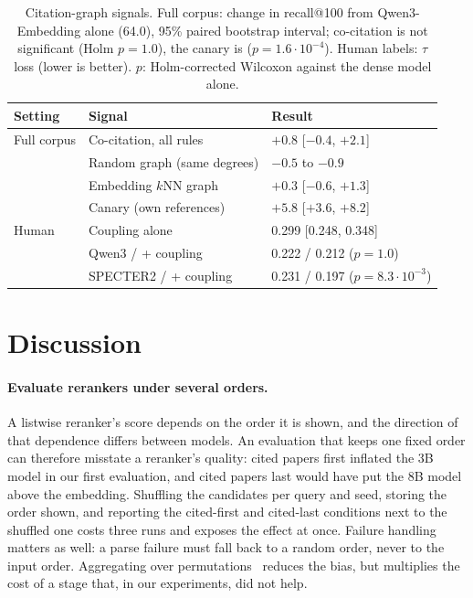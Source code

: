 \documentclass[sigconf,nonacm]{acmart}
\begin{document}
\begin{table}[t]
  \caption{Citation-graph signals. Full corpus: change in recall@100 from Qwen3-Embedding alone (64.0), 95\% paired bootstrap interval; co-citation is not significant (Holm $p = 1.0$), the canary is ($p = 1.6 \cdot 10^{-4}$). Human labels: $\tau$ loss (lower is better). $p$: Holm-corrected Wilcoxon against the dense model alone.}
  \label{tab:graph}
  \small
  \setlength{\tabcolsep}{4pt}
  \begin{tabular}{@{}lll@{}}
    \toprule
    Setting & Signal & Result \\
    \midrule
    Full corpus & Co-citation, all rules & $+0.8$ [$-0.4$, $+2.1$] \\
     & Random graph (same degrees) & $-0.5$ to $-0.9$ \\
     & Embedding $k$NN graph & $+0.3$ [$-0.6$, $+1.3$] \\
     & Canary (own references) & $+5.8$ [$+3.6$, $+8.2$] \\
    \midrule
    Human & Coupling alone & 0.299 [0.248, 0.348] \\
     & Qwen3 / + coupling & 0.222 / 0.212 ($p = 1.0$) \\
     & SPECTER2 / + coupling & 0.231 / 0.197 ($p = 8.3 \cdot 10^{-3}$) \\
    \bottomrule
  \end{tabular}
\end{table}

\section{Discussion}
\label{sec:discussion}
\paragraph{Evaluate rerankers under several orders.}
A listwise reranker's score depends on the order it is shown, and the direction of that dependence differs between models.
An evaluation that keeps one fixed order can therefore misstate a reranker's quality: cited papers first inflated the 3B model in our first evaluation, and cited papers last would have put the 8B model above the embedding.
Shuffling the candidates per query and seed, storing the order shown, and reporting the cited-first and cited-last conditions next to the shuffled one costs three runs and exposes the effect at once.
Failure handling matters as well: a parse failure must fall back to a random order, never to the input order.
Aggregating over permutations~\citep{tang2024found} reduces the bias, but multiplies the cost of a stage that, in our experiments, did not help.
\end{document}
